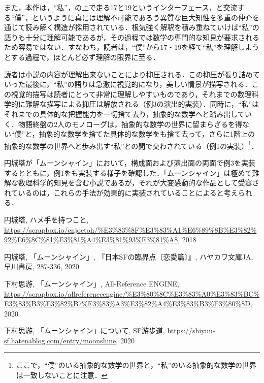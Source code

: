 \documentclass[10pt, a5paper, twoside]{jsarticle}
\theoremstyle{definition}
\begin{document}
		また，本作は，“私”，の上で走る17と19というインターフェース，と交流する“僕”，というように真には理解不可能であろう異質な巨大知性を多重の仲介を通じて読み解く構造が採用されている．根気強く解釈を積み重ねていけば“私”の語りも十分に理解可能であるが，その過程では数学の専門的な知見が要求されるため容易ではない．すなわち，読者は，“僕”から17・19を経て“私”を理解しようとする過程で，ほとんど必ず理解の限界に至る．

		読者は小説の内容が理解出来ないことにより抑圧される．この抑圧が張り詰めていった最後に，“私”の語りは急激に視覚的になり，美しい情景が描写される．この視覚的描写は読者にとって非常に理解しやすいものであり，それまでの数理科学的に難解な描写による抑圧は解放される（例3の演出的実装）．同時に，“私”はそれまでの具体的な把握能力を一切捨て去り，抽象的な数学へと踏み出していく．物語終盤の2人のモノローグは，抽象的な数学の世界に留まらざるを得ない“僕”と，抽象的な数学を捨てた具体的な数学をも捨て去って，さらに1階上の抽象的な数学の世界へと歩み出す“私”との間で交わされている（例1の実装）\footnote{ここで，“僕”のいる抽象的な数学の世界と，“私”のいる抽象的な数学の世界は一致しないことに注意．}．

		円城塔が「ムーンシャイン」において，構成面および演出面の両面で例3を実装するとともに，例1をも実装する様子を確認した．「ムーンシャイン」は極めて難解な数理科学的知見を含む小説であるが，それが大変感動的な作品として受容されているのは，これらの手法が効果的に実装されていることによると考えられる．		

	\begin{thebibliography}{99}

		 円城塔, ハメ手を持つこと, \url{https://scrapbox.io/enjoetoh/%E3%83%8F%E3%83%A1%E6%89%8B%E3%82%92%E6%8C%81%E3%81%A4%E3%81%93%E3%81%A8}, 2018

		 円城塔, 「ムーンシャイン」, 『日本SFの臨界点〔恋愛篇〕』, ハヤカワ文庫JA, 早川書房, 287-336, 2020

		 下村思游, 「ムーンシャイン」, All-Reference ENGINE, \url{https://scrapbox.io/allreferenceengine/%E3%80%8C%E3%83%A0%E3%83%BC%E3%83%B3%E3%82%B7%E3%83%A3%E3%82%A4%E3%83%B3%E3%80%8D}, 2020

		 下村思游, 「ムーンシャイン」について, SF游歩道, \url{https://shiyuu-sf.hatenablog.com/entry/moonshine}, 2020

	\end{thebibliography}
\end{document}
